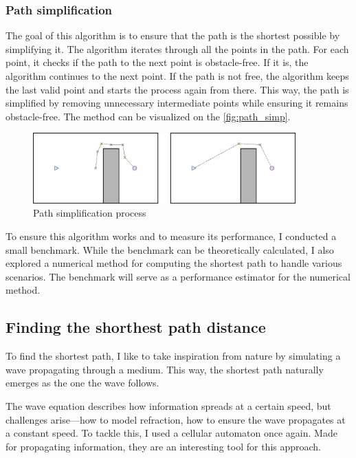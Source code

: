 \documentclass[../main.tex]{subfiles}
\begin{document}
\subsubsection{Path simplification}

The goal of this algorithm is to ensure that the path is the shortest possible by simplifying it. The algorithm iterates through all the points in the path. For each point, it checks if the path to the next point is obstacle-free. If it is, the algorithm continues to the next point. If the path is not free, the algorithm keeps the last valid point and starts the process again from there. This way, the path is simplified by removing unnecessary intermediate points while ensuring it remains obstacle-free. The method can be visualized on the \autoref{fig:path_simp}.

\begin{figure}[H]
	\centering
	\includegraphics[width=0.9\textwidth]{IMAGES/part3/shorten_path.png}
	\caption{Path simplification process}
	\label{fig:path_simp}
\end{figure}

To ensure this algorithm works and to measure its performance, I conducted a small benchmark. While the benchmark can be theoretically calculated, I also explored a numerical method for computing the shortest path to handle various scenarios. The benchmark will serve as a performance estimator for the numerical method.

\subsection{Finding the shorthest path distance}
To find the shortest path, I like to take inspiration from nature by simulating a wave propagating through a medium. This way, the shortest path naturally emerges as the one the wave follows.  

\vspace{1em}

The wave equation describes how information spreads at a certain speed, but challenges arise—how to model refraction, how to ensure the wave propagates at a constant speed. To tackle this, I used a cellular automaton once again. Made for propagating information, they are an interesting tool for this approach.\cite{tapia_2016}
\end{document}
